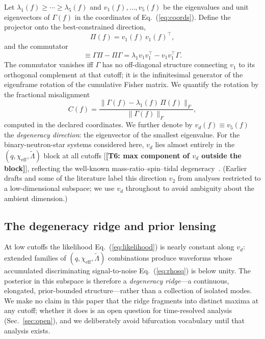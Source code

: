 \documentclass[twocolumn,prd,showpacs,superscriptaddress]{revtex4-2}
\newcommand{\comm}[2]{[#1, #2]}
\newcommand{\norm}[1]{\lVert #1 \rVert}
\newcommand{\Lambdatilde}{\tilde{\Lambda}}
\newcommand{\chieff}{\chi_{\text{eff}}}
\newcommand{\vd}{v_{d}}          %
\newcommand{\manifest}[1]{\textbf{[#1]}}
\newcommand{\secref}[1]{Sec.~\ref{sec:#1}}
\newcommand{\eqnref}[1]{Eq.~(\ref{eq:#1})}
\begin{document}
Let $\lambda_1(f) \ge \cdots \ge \lambda_5(f)$ and $v_1(f), \ldots, v_5(f)$ be the eigenvalues and unit eigenvectors of $\Gamma(f)$ in the coordinates of \eqnref{coords}. Define the projector onto the best-constrained direction,
\begin{equation}
\Pi(f) = v_1(f)\,v_1(f)^{\top},
\label{eq:projector}
\end{equation}
and the commutator
\begin{equation}
\comm{\Gamma}{\Pi} \equiv \Gamma\Pi - \Pi\Gamma
= \lambda_1 v_1 v_1^{\top} - v_1 v_1^{\top}\Gamma .
\label{eq:commutator_def}
\end{equation}
The commutator vanishes iff $\Gamma$ has no off-diagonal structure connecting $v_1$ to its orthogonal complement at that cutoff; it is the infinitesimal generator of the eigenframe rotation of the cumulative Fisher matrix. We quantify the rotation by the fractional misalignment
\begin{equation}
C(f) = \frac{\norm{\Gamma(f) - \lambda_1(f)\,\Pi(f)}_F}
{\norm{\Gamma(f)}_F},
\label{eq:cross_coupling}
\end{equation}
computed in the declared coordinates. We further denote by $\vd(f) \equiv v_5(f)$ the \emph{degeneracy direction}: the eigenvector of the smallest eigenvalue. For the binary-neutron-star systems considered here, $\vd$ lies almost entirely in the $(q, \chieff, \Lambdatilde)$ block at all cutoffs [\manifest{T6: max component of $\vd$ outside the block}], reflecting the well-known mass-ratio--spin--tidal degeneracy~\cite{chatziioannou2020bns}. (Earlier drafts and some of the literature label this direction $v_2$ from analyses restricted to a low-dimensional subspace; we use $\vd$ throughout to avoid ambiguity about the ambient dimension.)

\subsection{The degeneracy ridge and prior lensing}
\label{sec:ridge}

At low cutoffs the likelihood \eqnref{likelihood} is nearly constant along $\vd$: extended families of $(q, \chieff, \Lambdatilde)$ combinations produce waveforms whose accumulated discriminating signal-to-noise \eqnref{rhosq} is below unity. The posterior in this subspace is therefore a \emph{degeneracy ridge}---a continuous, elongated, prior-bounded structure---rather than a collection of isolated modes. We make no claim in this paper that the ridge fragments into distinct maxima at any cutoff; whether it does is an open question for time-resolved analysis (\secref{open}), and we deliberately avoid bifurcation vocabulary until that analysis exists.
\end{document}
